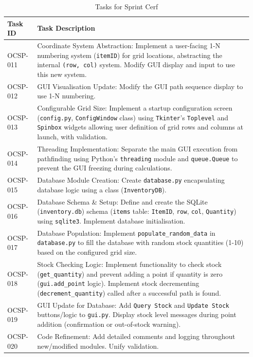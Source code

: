 \begin{table}[htbp]
	\centering
	\begin{tabularx}{\textwidth}{|l|X|}
		\hline
		\textbf{Task ID} & \textbf{Task Description} \\
		\hline
		OCSP-011 & Coordinate System Abstraction: Implement a user-facing 1-N numbering system (\verb|itemID|) for grid locations, abstracting the internal \verb|(row, col)| system. Modify GUI display and input to use this new system. \\
		\hline
		OCSP-012 & GUI Visualisation Update: Modify the GUI path sequence display to use 1-N numbering. \\
		\hline
		OCSP-013 & Configurable Grid Size: Implement a startup configuration screen (\verb|config.py|, \verb|ConfigWindow| class) using \verb|Tkinter|'s \verb|Toplevel| and \verb|Spinbox| widgets allowing user definition of grid rows and columns at launch, with validation. \\
		\hline
		OCSP-014 & Threading Implementation: Separate the main GUI execution from pathfinding using Python's \verb|threading| module and \verb|queue.Queue| to prevent the GUI freezing during calculations. \\
		\hline
		OCSP-015 & Database Module Creation: Create \verb|database.py| encapsulating database logic using a class (\verb|InventoryDB|). \\
		\hline
		OCSP-016 & Database Schema \& Setup: Define and create the SQLite (\verb|inventory.db|) schema (\verb|items| table: \verb|ItemID|, \verb|row|, \verb|col|, \verb|Quantity|) using \verb|sqlite3|. Implement database initialisation. \\
		\hline
		OCSP-017 & Database Population: Implement \verb|populate_random_data| in \verb|database.py| to fill the database with random stock quantities (1-10) based on the configured grid size. \\
		\hline
		OCSP-018 & Stock Checking Logic: Implement functionality to check stock (\verb|get_quantity|) and prevent adding a point if quantity is zero (\verb|gui.add_point| logic). Implement stock decrementing (\verb|decrement_quantity|) called after a successful path is found. \\
		\hline
		OCSP-019 & GUI Update for Database: Add \verb|Query Stock| and \verb|Update Stock| buttons/logic to \verb|gui.py|. Display stock level messages during point addition (confirmation or out-of-stock warning). \\
		\hline
		OCSP-020 & Code Refinement: Add detailed comments and logging throughout new/modified modules. Unify validation. \\
		\hline
	\end{tabularx}
	\caption{Tasks for Sprint Cerf}
\end{table}

